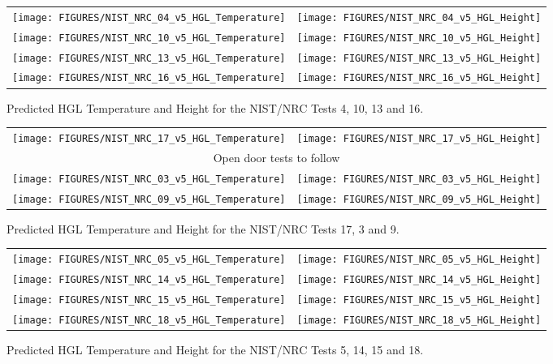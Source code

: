 \begin{figure}[p]
\begin{tabular*}{\textwidth}{l@{\extracolsep{\fill}}r}
\texttt{[image: FIGURES/NIST\_NRC\_04\_v5\_HGL\_Temperature]} &
\texttt{[image: FIGURES/NIST\_NRC\_04\_v5\_HGL\_Height]} \\
\texttt{[image: FIGURES/NIST\_NRC\_10\_v5\_HGL\_Temperature]} &
\texttt{[image: FIGURES/NIST\_NRC\_10\_v5\_HGL\_Height]} \\
\texttt{[image: FIGURES/NIST\_NRC\_13\_v5\_HGL\_Temperature]} &
\texttt{[image: FIGURES/NIST\_NRC\_13\_v5\_HGL\_Height]} \\
\texttt{[image: FIGURES/NIST\_NRC\_16\_v5\_HGL\_Temperature]} &
\texttt{[image: FIGURES/NIST\_NRC\_16\_v5\_HGL\_Height]}
\end{tabular*}
\caption{Predicted HGL Temperature and Height for the NIST/NRC Tests 4, 10, 13 and 16.} \label{NIST_NRC_HGL_Closed_2}
\end{figure}

\begin{figure}[p]
\begin{tabular*}{\textwidth}{l@{\extracolsep{\fill}}r}
\texttt{[image: FIGURES/NIST\_NRC\_17\_v5\_HGL\_Temperature]} &
\texttt{[image: FIGURES/NIST\_NRC\_17\_v5\_HGL\_Height]} \\
\multicolumn{2}{c}{Open door tests to follow} \\
\texttt{[image: FIGURES/NIST\_NRC\_03\_v5\_HGL\_Temperature]} &
\texttt{[image: FIGURES/NIST\_NRC\_03\_v5\_HGL\_Height]} \\
\texttt{[image: FIGURES/NIST\_NRC\_09\_v5\_HGL\_Temperature]} &
\texttt{[image: FIGURES/NIST\_NRC\_09\_v5\_HGL\_Height]}
\end{tabular*}
\caption{Predicted HGL Temperature and Height for the NIST/NRC Tests 17, 3 and 9.} \label{NIST_NRC_HGL_Open_1}
\end{figure}

\begin{figure}[p]
\begin{tabular*}{\textwidth}{l@{\extracolsep{\fill}}r}
\texttt{[image: FIGURES/NIST\_NRC\_05\_v5\_HGL\_Temperature]} &
\texttt{[image: FIGURES/NIST\_NRC\_05\_v5\_HGL\_Height]} \\
\texttt{[image: FIGURES/NIST\_NRC\_14\_v5\_HGL\_Temperature]} &
\texttt{[image: FIGURES/NIST\_NRC\_14\_v5\_HGL\_Height]} \\
\texttt{[image: FIGURES/NIST\_NRC\_15\_v5\_HGL\_Temperature]} &
\texttt{[image: FIGURES/NIST\_NRC\_15\_v5\_HGL\_Height]} \\
\texttt{[image: FIGURES/NIST\_NRC\_18\_v5\_HGL\_Temperature]} &
\texttt{[image: FIGURES/NIST\_NRC\_18\_v5\_HGL\_Height]}
\end{tabular*}
\caption{Predicted HGL Temperature and Height for the NIST/NRC Tests 5, 14, 15 and 18.} \label{NIST_NRC_HGL_Open_2}
\end{figure}


